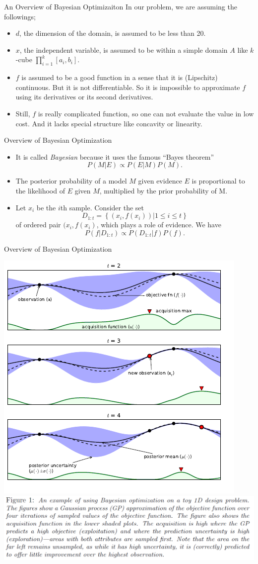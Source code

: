\documentclass{beamer}
\begin{document}
%
\begin{frame}{An Overview of Bayesian Optimizaiton}
In our problem, we are assuming the followings;
\begin{itemize}
\item
\(d\), the dimension of the domain, is assumed to be less than 20.
\item
\(x\), the independent variable, is assumed to be within a simple domain \(A\) like \(k\)-cube \(\prod_{i=1}^k[a_i,b_i]\).
\item
\(f\) is assumed to be a good function in a sense that it is (Lipschitz) continuous.
But it is not differentiable.
So it is impossible to approximate \(f\) using its derivatives or its second derivatives.
\item
Still, \(f\) is really complicated function, so one can not evaluate the value in low cost.
And it lacks special structure like concavity or linearity.
\end{itemize}
\end{frame}

%
\begin{frame}{Overview of Bayesian Optimization}
\begin{itemize}
\item
It is called \emph{Bayesian} because it uses the famous ``Bayes theorem''
\[P(M|E)\propto P(E|M)P(M).\]
\item
The \alert{posterior} probability of a model \(M\) given \alert{evidence} \(E\) is proportional to the \alert{likelihood} of \(E\) given \(M\), multiplied by the \alert{prior} probability of M.
\item
Let \(x_i\) be the \(i\)th sample.
Consider the set
\[D_{1:t}=\left\{\left(x_i,f(x_i)\right)|1\le i\le t\right\}\]
of ordered pair \((x_i,f(x_i)\), which plays a role of evidence.
We have
\[P(f|D_{1:t})\propto P(D_{1:t}|f)P(f).\]
\end{itemize}
\end{frame}

%
\begin{frame}{Overview of Bayesian Optimization}
\begin{center}
\includegraphics[width=.5\textwidth]{overview_1}
\includegraphics[width=.5\textwidth]{overview_2}
\end{center}
\end{frame}
\end{document}
